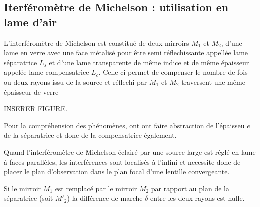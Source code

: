 \documentclass[a4paper,12pt]{article}
\theoremstyle{StyleTheo_will}
\theoremstyle{remark}
\begin{document}
\subsection{Iterféromètre de Michelson : utilisation en lame d'air}

L'interféromètre de Michelson est constitué de deux mirroirs $M_1$ et $M_2$, d'une lame en verre avec une face métalisé pour être semi réflechissante appellée lame séparatrice $L_s$ et d'une lame transparente de même indice et de même épaisseur appelée lame compensatrice $L_c$. Celle-ci permet de compenser le nombre de fois ou deux rayons issu de la source et réflechi par $M_1$ et $M_2$ traversent une même épaisseur de verre


INSERER FIGURE.

Pour la compréhension des phénomènes, ont ont faire abstraction de l'épaisseu $e$ de la séparatrice et donc de la compensatrice également.

Quand l'interféromètre de Michelson éclairé par une source large est réglé en lame à faces parallèles, les interférences sont localisés à l'infini et necessite donc de placer le plan d'observation dans le plan focal d'une lentille convergeante.

Si le mirroir $M_1$ est remplacé par le mirroir $M_2$ par rapport au plan de la séparatrice (soit $M'_2$) la différence de marche $\delta$ entre les deux rayons est nulle.
\end{document}
